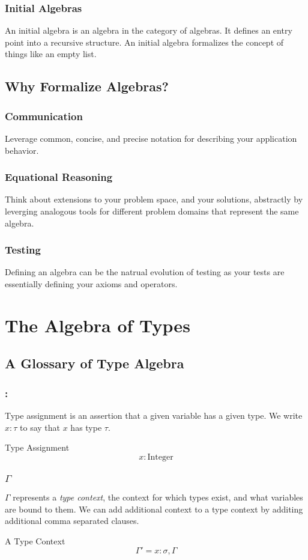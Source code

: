 \documentclass{beamer}
\begin{document}
\begin{frame}
  \frametitle{Initial Algebras}
  An initial algebra is an algebra in the category of algebras.  It
  defines an entry point into a recursive structure.  An initial
  algebra formalizes the concept of things like an empty list.
\end{frame}

\subsection{Why Formalize Algebras?}

\begin{frame}
  \frametitle{Communication}
  Leverage common, concise, and precise notation for describing your application behavior.
\end{frame}

\begin{frame}
  \frametitle{Equational Reasoning}
  Think about extensions to your problem space, and your solutions,
  abstractly by leverging analogous tools for different problem
  domains that represent the same algebra.
\end{frame}

\begin{frame}
  \frametitle{Testing}
  Defining an algebra can be the natrual evolution of testing as your
  tests are essentially defining your axioms and operators.
\end{frame}

\section{The Algebra of Types}

\subsection{A Glossary of Type Algebra}

\begin{frame}
  \frametitle{:}
  Type assignment is an assertion that a given variable has a given
  type.  We write $x : \tau$ to say that $x$ has type $\tau$.
  \begin{exampleblock}{Type Assignment}
    \[
      x : \text{Integer}
    \]
  \end{exampleblock}
\end{frame}

\begin{frame}
  \frametitle{$\Gamma$}
  $\Gamma$ represents a \emph{type context}, the context for which
  types exist, and what variables are bound to them.  We can add
  additional context to a type context by additing additional comma
  separated clauses.
  \begin{exampleblock}{A Type Context}
    \[
      \Gamma' = x : \sigma, \Gamma
    \]
  \end{exampleblock}

\end{frame}
\end{document}
